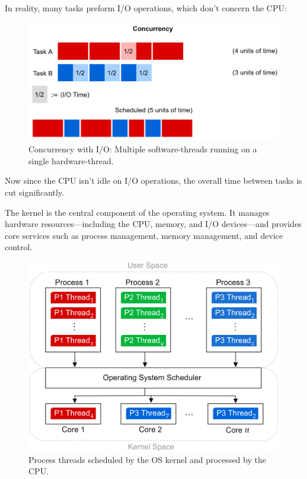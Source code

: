 \noindent
In reality, many tasks preform I/O operations, which don't 
concern the CPU:
\begin{figure}[h]
    \centering
    \includegraphics[width=.75\textwidth]{./Sections/high/concurrency_io.png}
    \caption{Concurrency with I/O: Multiple software-threads running on a single hardware-thread.}
\end{figure}

\noindent
Now since the CPU isn't idle on I/O operations, the overall time between tasks is cut significantly.

\newpage

\begin{Def}[Kernel]
    
    The kernel is the central component of the operating system. It manages hardware resources—including the CPU, memory, and I/O devices—and provides core services such as process management, memory management, and device control.
\end{Def}

\begin{figure}[h]
    \centering
    \includegraphics[width=1\textwidth]{./Sections/high/user_kernel.png}
    \caption{Process threads scheduled by the OS kernel and processed by the CPU.}
    \label{fig:kernel}
\end{figure}

